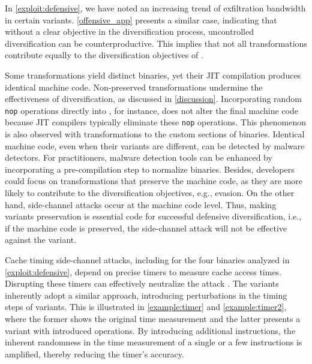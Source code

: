\label{exploit:discussion}
In \autoref{exploit:defensive}, we have noted an increasing trend of exfiltration bandwidth in certain variants. 
\autoref{offensive_app} presents a similar case, indicating that without a clear objective in the diversification process, uncontrolled diversification can be counterproductive. 
This implies that not all transformations contribute equally to the diversification objectives of \Wasm.


Some transformations yield distinct \Wasm binaries, yet their JIT compilation produces identical machine code.
Non-preserved transformations undermine the effectiveness of diversification, as discussed in \autoref{discussion}.
Incorporating random \texttt{nop} operations directly into \Wasm, for instance, does not alter the final machine code because JIT compilers typically eliminate these \texttt{nop} operations.
This phenomenon is also observed with transformations to the custom sections of \Wasm binaries.
Identical machine code, even when their \Wasm variants are different, can be detected by malware detectors.
For practitioners, malware detection tools can be enhanced by incorporating a pre-compilation step to normalize \Wasm binaries.
Besides, developers could focus on transformations that preserve the machine code, as they are more likely to contribute to the diversification objectives, e.g., evasion.
On the other hand, side-channel attacks occur at the machine code level.
Thus, making \Wasm variants preservation is essential code for successful defensive diversification, i.e., if the machine code is preserved, the side-channel attack will not be effective against the \Wasm variant.


 
 Cache timing side-channel attacks, including for the four binaries analyzed in \autoref{exploit:defensive}, depend on precise timers to measure cache access times. 
Disrupting these timers can effectively neutralize the attack \cite{JStimers}. 
The \Wasm variants inherently adopt a similar approach, introducing perturbations in the timing steps of \Wasm variants. 
This is illustrated in \autoref{example:timer} and \autoref{example:timer2}, where the former shows the original time measurement and the latter presents a variant with introduced operations.
By introducing additional instructions, the inherent randomness in the time measurement of a single or a few instructions is amplified, thereby reducing the timer's accuracy. 

